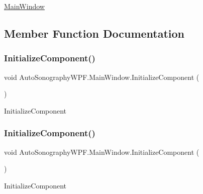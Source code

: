 \hyperlink{class_auto_sonography_w_p_f_1_1_main_window}{Main\+Window} 

\subsection{Member Function Documentation}
\hypertarget{class_auto_sonography_w_p_f_1_1_main_window_a78046a04c327527f4db402722f7aea35}{}\label{class_auto_sonography_w_p_f_1_1_main_window_a78046a04c327527f4db402722f7aea35} 
\subsubsection{\texorpdfstring{Initialize\+Component()}{InitializeComponent()}\hspace{0.1cm}{\footnotesize\ttfamily [1/6]}}
{\footnotesize\ttfamily void Auto\+Sonography\+W\+P\+F.\+Main\+Window.\+Initialize\+Component (\begin{DoxyParamCaption}{ }\end{DoxyParamCaption})}



Initialize\+Component 

\hypertarget{class_auto_sonography_w_p_f_1_1_main_window_a78046a04c327527f4db402722f7aea35}{}\label{class_auto_sonography_w_p_f_1_1_main_window_a78046a04c327527f4db402722f7aea35} 
\subsubsection{\texorpdfstring{Initialize\+Component()}{InitializeComponent()}\hspace{0.1cm}{\footnotesize\ttfamily [2/6]}}
{\footnotesize\ttfamily void Auto\+Sonography\+W\+P\+F.\+Main\+Window.\+Initialize\+Component (\begin{DoxyParamCaption}{ }\end{DoxyParamCaption})}



Initialize\+Component 

